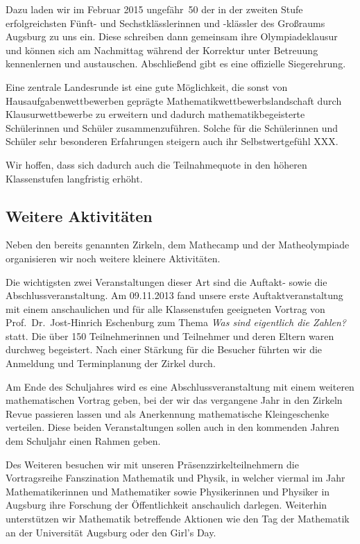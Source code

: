 \documentclass[12pt]{zettel}
\begin{document}
Dazu laden wir im Februar 2015 ungefähr~50 der in der zweiten Stufe
erfolgreichsten Fünft- und Sechstklässlerinnen und -klässler des Großraums
Augsburg zu uns ein. Diese schreiben dann gemeinsam ihre Olympiadeklausur und
können sich am Nachmittag während der Korrektur unter Betreuung kennenlernen
und austauschen. Abschließend gibt es eine offizielle Siegerehrung.

Eine zentrale Landesrunde ist eine gute Möglichkeit, die sonst von
Hausaufgabenwettbewerben geprägte Mathematikwettbewerbslandschaft durch
Klausurwettbewerbe zu erweitern und dadurch mathematikbegeisterte Schülerinnen
und Schüler zusammenzuführen. Solche für die Schülerinnen und Schüler
sehr besonderen Erfahrungen steigern auch ihr Selbstwertgefühl XXX.

Wir hoffen, dass sich dadurch auch die Teilnahmequote
in den höheren Klassenstufen langfristig erhöht.


\subsection{Weitere Aktivitäten}

Neben den bereits genannten Zirkeln, dem Mathecamp und der
Matheolympiade organisieren wir noch weitere kleinere
Aktivitäten.

Die wichtigsten zwei Veranstaltungen dieser Art sind die Auftakt- sowie die
Abschlussveranstaltung. Am 09.11.2013 fand unsere erste
Auftaktveranstaltung mit einem anschaulichen und für alle Klassenstufen
geeigneten Vortrag von
Prof.~Dr.~Jost-Hinrich Eschenburg zum Thema \emph{Was sind eigentlich die
Zahlen?} statt.
Die über 150 Teilnehmerinnen und Teilnehmer und deren Eltern waren durchweg
begeistert. Nach einer Stärkung für die Besucher führten wir
die Anmeldung und Terminplanung der Zirkel durch.

Am Ende des Schuljahres wird es eine Abschlussveranstaltung mit einem
weiteren mathematischen Vortrag geben, bei der wir
das vergangene Jahr in den Zirkeln Revue passieren lassen und als Anerkennung
mathematische Kleingeschenke verteilen. Diese beiden Veranstaltungen sollen
auch in den kommenden Jahren dem Schuljahr einen Rahmen geben.

Des Weiteren besuchen wir mit unseren Präsenzzirkelteilnehmern die
Vortragsreihe Fanszination Mathematik und Physik, in welcher viermal im
Jahr Mathematikerinnen und Mathematiker sowie Physikerinnen und Physiker in Augsburg ihre Forschung der
Öffentlichkeit anschaulich darlegen. Weiterhin unterstützen wir
Mathematik betreffende Aktionen wie den Tag der Mathematik an
der Universität Augsburg oder den Girl's Day.
\end{document}
